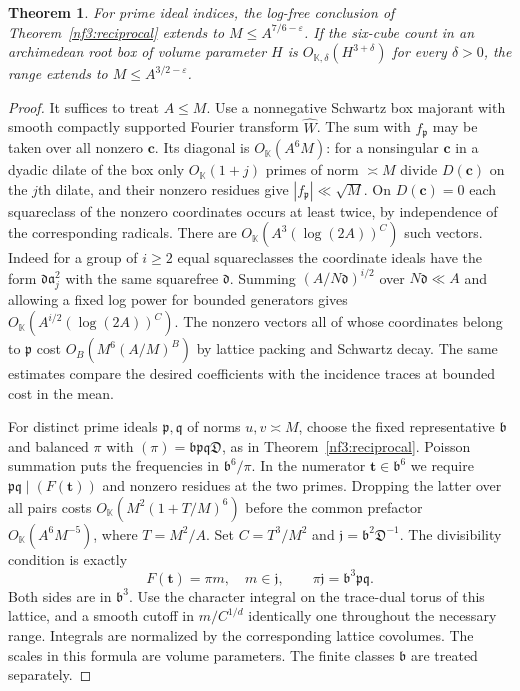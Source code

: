 \documentclass[11pt,letterpaper]{article}
\newtheorem{theorem}{Theorem}[section]
\theoremstyle{definition}
\numberwithin{equation}{section}
\begin{document}
\begin{theorem}\label{nf3:longprime}
For prime ideal indices, the log-free conclusion
of Theorem~\ref{nf3:reciprocal} extends to $M\le A^{7/6-\varepsilon}$.
If the six-cube count in an archimedean root box of volume parameter
$H$ is $O_{\mathbb K,\delta}(H^{3+\delta})$ for every $\delta>0$,
the range extends to $M\le A^{3/2-\varepsilon}$.
\end{theorem}
\begin{proof}
It suffices to treat $A\le M$. Use a nonnegative Schwartz box
majorant with smooth compactly supported Fourier transform $\widehat W$.
The sum with $f_{\mathfrak p}$ may be taken over all nonzero
$\mathbf c$. Its diagonal is $O_{\mathbb K}(A^6M)$: for a nonsingular
$\mathbf c$ in a dyadic dilate of the box only $O_{\mathbb K}(1+j)$
primes of norm $\asymp M$ divide $D(\mathbf c)$ on the $j$th
dilate, and their nonzero residues give $|f_{\mathfrak p}|\ll\sqrt M$.
On $D(\mathbf c)=0$ each squareclass of the nonzero coordinates
occurs at least twice, by independence of the corresponding radicals.
There are $O_{\mathbb K}(A^3(\log(2A))^C)$ such vectors. Indeed for
a group of $i\ge2$ equal squareclasses the coordinate ideals have
the form $\mathfrak d\mathfrak a_j^2$ with the same squarefree
$\mathfrak d$. Summing $(A/N\mathfrak d)^{i/2}$ over
$N\mathfrak d\ll A$ and allowing a fixed log power for bounded
generators gives $O_{\mathbb K}(A^{i/2}(\log(2A))^C)$.
The nonzero vectors all of whose coordinates belong to $\mathfrak p$
cost $O_B(M^6(A/M)^B)$ by lattice packing and Schwartz decay.
The same estimates compare the desired coefficients with the
incidence traces at bounded cost in the mean.

For distinct prime ideals $\mathfrak p,\mathfrak q$ of norms
$u,v\asymp M$, choose the fixed representative $\mathfrak b$ and
balanced $\pi$ with $(\pi)=\mathfrak b\mathfrak p\mathfrak q
\mathfrak D$, as in Theorem~\ref{nf3:reciprocal}. Poisson summation
puts the frequencies in $\mathfrak b^6/\pi$. In the numerator
$\mathbf t\in\mathfrak b^6$ we require
$\mathfrak p\mathfrak q\mid(F(\mathbf t))$ and nonzero residues
at the two primes. Dropping the latter over all pairs costs
$O_{\mathbb K}(M^2(1+T/M)^6)$ before the common prefactor
$O_{\mathbb K}(A^6M^{-5})$, where $T=M^2/A$. Set $C=T^3/M^2$ and
$\mathfrak j=\mathfrak b^2\mathfrak D^{-1}$.
The divisibility condition is exactly
\[
 F(\mathbf t)=\pi m,\quad m\in\mathfrak j,
 \qquad \pi\mathfrak j=\mathfrak b^3\mathfrak p\mathfrak q.
\]
Both sides are in $\mathfrak b^3$. Use the character integral on
the trace-dual torus of this lattice, and a smooth cutoff in
$m/C^{1/d}$ identically one throughout the necessary range.
Integrals are normalized by the corresponding lattice covolumes.
The scales in this formula are volume parameters. The finite
classes $\mathfrak b$ are treated separately.


\end{proof}
\end{document}
